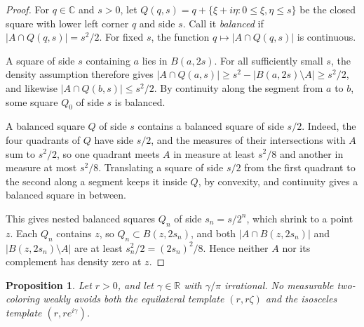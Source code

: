 \documentclass[10pt]{article}
\newtheorem{prop}[thm]{Proposition}
\theoremstyle{remark}
\newcommand{\C}{\mathbb C}
\newcommand{\R}{\mathbb R}
\begin{document}
\begin{proof}
For $q\in\C$ and $s>0$, let $Q(q,s)=q+\{\xi+i\eta:0\le\xi,\eta\le s\}$ be the closed square with lower left corner $q$ and side $s$. Call it \emph{balanced} if $|A\cap Q(q,s)|=s^2/2$. For fixed $s$, the function $q\mapsto|A\cap Q(q,s)|$ is continuous.

A square of side $s$ containing $a$ lies in $B(a,2s)$. For all sufficiently small $s$, the density assumption therefore gives $|A\cap Q(a,s)|\ge s^2-|B(a,2s)\setminus A|\ge s^2/2$, and likewise $|A\cap Q(b,s)|\le s^2/2$. By continuity along the segment from $a$ to $b$, some square $Q_0$ of side $s$ is balanced.

A balanced square $Q$ of side $s$ contains a balanced square of side $s/2$. Indeed, the four quadrants of $Q$ have side $s/2$, and the measures of their intersections with $A$ sum to $s^2/2$, so one quadrant meets $A$ in measure at least $s^2/8$ and another in measure at most $s^2/8$. Translating a square of side $s/2$ from the first quadrant to the second along a segment keeps it inside $Q$, by convexity, and continuity gives a balanced square in between.

This gives nested balanced squares $Q_n$ of side $s_n=s/2^n$, which shrink to a point $z$. Each $Q_n$ contains $z$, so $Q_n\subset B(z,2s_n)$, and both $|A\cap B(z,2s_n)|$ and $|B(z,2s_n)\setminus A|$ are at least $s_n^2/2=(2s_n)^2/8$. Hence neither $A$ nor its complement has density zero at $z$.
\end{proof}

\begin{prop}\label{prop:circlecore}
Let $r>0$, and let $\gamma\in\R$ with $\gamma/\pi$ irrational. No measurable two-coloring weakly avoids both the equilateral template $(r,r\zeta)$ and the isosceles template $(r,re^{i\gamma})$.
\end{prop}
\end{document}
